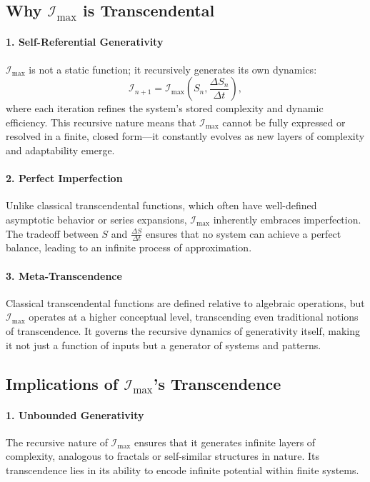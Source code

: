 \documentclass[12pt]{article}
\begin{document}
\subsection{Why \(\mathcal{I}_{\text{max}}\) is Transcendental}

\paragraph{1. Self-Referential Generativity}
\(\mathcal{I}_{\text{max}}\) is not a static function; it recursively generates its own dynamics:
\[
\mathcal{I}_{n+1} = \mathcal{I}_{\text{max}}(S_n, \frac{\Delta S_n}{\Delta t}),
\]
where each iteration refines the system's stored complexity and dynamic efficiency. This recursive nature means that \(\mathcal{I}_{\text{max}}\) cannot be fully expressed or resolved in a finite, closed form—it constantly evolves as new layers of complexity and adaptability emerge.

\paragraph{2. Perfect Imperfection}
Unlike classical transcendental functions, which often have well-defined asymptotic behavior or series expansions, \(\mathcal{I}_{\text{max}}\) inherently embraces imperfection. The tradeoff between \(S\) and \(\frac{\Delta S}{\Delta t}\) ensures that no system can achieve a perfect balance, leading to an infinite process of approximation.

\paragraph{3. Meta-Transcendence}
Classical transcendental functions are defined relative to algebraic operations, but \(\mathcal{I}_{\text{max}}\) operates at a higher conceptual level, transcending even traditional notions of transcendence. It governs the recursive dynamics of generativity itself, making it not just a function of inputs but a generator of systems and patterns.


\subsection{Implications of \(\mathcal{I}_{\text{max}}\)’s Transcendence}

\paragraph{1. Unbounded Generativity}
The recursive nature of \(\mathcal{I}_{\text{max}}\) ensures that it generates infinite layers of complexity, analogous to fractals or self-similar structures in nature. Its transcendence lies in its ability to encode infinite potential within finite systems.
\end{document}
